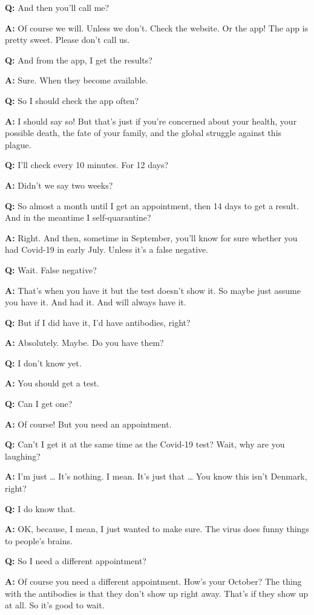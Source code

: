 \textbf{Q:} And then you'll call me?

\textbf{A:} Of course we will. Unless we don't. Check the website. Or
the app! The app is pretty sweet. Please don't call us.

\textbf{Q:} And from the app, I get the results?

\textbf{A:} Sure. When they become available.

\textbf{Q:} So I should check the app often?

\textbf{A:} I should say so! But that's just if you're concerned about
your health, your possible death, the fate of your family, and the
global struggle against this plague.

\textbf{Q:} I'll check every 10 minutes. For 12 days?

\textbf{A:} Didn't we say two weeks?

\textbf{Q:} So almost a month until I get an appointment, then 14 days
to get a result. And in the meantime I self-quarantine?

\textbf{A:} Right. And then, sometime in September, you'll know for sure
whether you had Covid-19 in early July. Unless it's a false negative.

\textbf{Q:} Wait. False negative?

\textbf{A:} That's when you have it but the test doesn't show it. So
maybe just assume you have it. And had it. And will always have it.

\textbf{Q:} But if I did have it, I'd have antibodies, right?

\textbf{A:} Absolutely. Maybe. Do you have them?

\textbf{Q:} I don't know yet.

\textbf{A:} You should get a test.

\textbf{Q:} Can I get one?

\textbf{A:} Of course! But you need an appointment.

\textbf{Q:} Can't I get it at the same time as the Covid-19 test? Wait,
why are you laughing?

\textbf{A:} I'm just \ldots{} It's nothing. I mean. It's just that
\ldots{} You know this isn't Denmark, right?

\textbf{Q:} I do know that.

\textbf{A:} OK, because, I mean, I just wanted to make sure. The virus
does funny things to people's brains.

\textbf{Q:} So I need a different appointment?

\textbf{A:} Of course you need a different appointment. How's your
October? The thing with the antibodies is that they don't show up right
away. That's if they show up at all. So it's good to wait.

